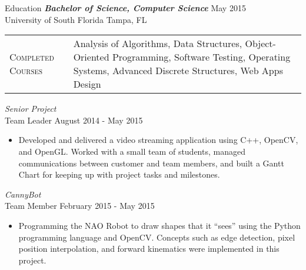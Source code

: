 \begin{section}{Education}
  {\sl \textbf{Bachelor of Science, Computer Science}} \hfill May 2015 \\
  University of South Florida \hfill Tampa, FL \\
  \begin{tabularx}{\linewidth}{@{}l X@{}}
    \textsc{Completed Courses} &\small{Analysis of Algorithms, Data Structures, Object-Oriented Programming, Software Testing, Operating Systems, Advanced Discrete Structures, Web Apps Design}\\
  \end{tabularx}
  {\sl Senior Project} \\ Team Leader \hfill August 2014 - May 2015
  \begin{itemize}
    \item Developed and delivered a video streaming application using C++, OpenCV, and OpenGL. Worked with a small team of students, managed communications between customer and team members, and built a Gantt Chart for keeping up with project tasks and milestones.
  \end{itemize}
  {\sl CannyBot} \\ Team Member \hfill February 2015 - May 2015
  \begin{itemize}
    \item Programming the NAO Robot to draw shapes that it ``sees'' using the Python programming language and OpenCV. Concepts such as edge detection, pixel position interpolation, and forward kinematics were implemented in this project.
  \end{itemize}
\end{section}
